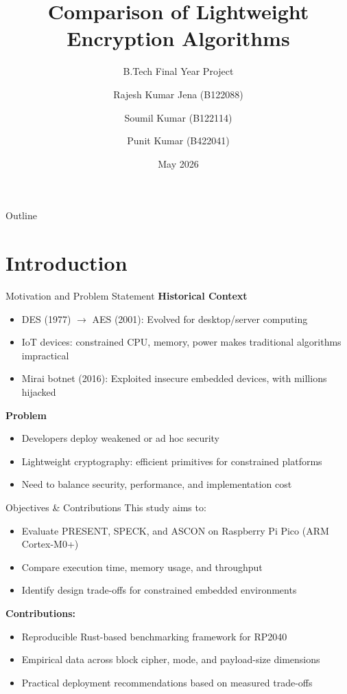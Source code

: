 \documentclass[aspectratio=169]{beamer}
\title[Lightweight Encryption]{Comparison of Lightweight Encryption Algorithms}
\subtitle{B.Tech Final Year Project}
\author[R. Jena, S. Kumar, P. Kumar]{
Rajesh Kumar Jena (B122088) \and
Soumil Kumar (B122114) \and
Punit Kumar (B422041)
}
\institute{
International Institute of Information Technology\\
Bhubaneswar\\
Supervisor: Prof. Debasish Jena
}
\date{May 2026}
\begin{document}
\begin{frame}
\titlepage
\end{frame}

\begin{frame}{Outline}
\tableofcontents
\end{frame}

\section{Introduction}

\begin{frame}{Motivation and Problem Statement}
\textbf{Historical Context}
\begin{itemize}
    \item DES (1977) $\rightarrow$ AES (2001): Evolved for desktop/server computing
    \item IoT devices: constrained CPU, memory, power makes traditional algorithms impractical
    \item Mirai botnet (2016): Exploited insecure embedded devices, with millions hijacked
\end{itemize}

\vspace{0.2cm}
\textbf{Problem}
\begin{itemize}
    \item Developers deploy weakened or ad hoc security
    \item Lightweight cryptography: efficient primitives for constrained platforms
    \item Need to balance security, performance, and implementation cost
\end{itemize}
\end{frame}

\begin{frame}{Objectives \& Contributions}
This study aims to:
\begin{itemize}
    \item Evaluate PRESENT, SPECK, and ASCON on Raspberry Pi Pico (ARM Cortex-M0+)
    \item Compare execution time, memory usage, and throughput
    \item Identify design trade-offs for constrained embedded environments
\end{itemize}

\vspace{0.2cm}
\textbf{Contributions:}
\begin{itemize}
    \item Reproducible Rust-based benchmarking framework for RP2040
    \item Empirical data across block cipher, mode, and payload-size dimensions
    \item Practical deployment recommendations based on measured trade-offs
\end{itemize}
\end{frame}
\end{document}
